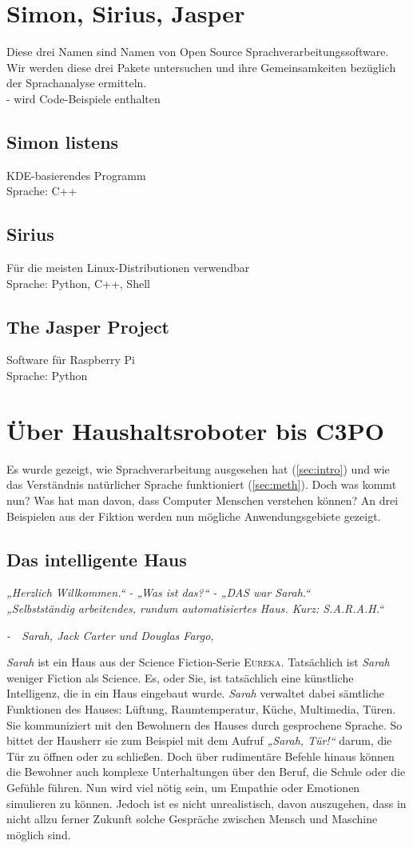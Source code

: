 \documentclass[12pt,twoside]{article}
\theoremstyle{plain}
\theoremstyle{definition}
\theoremstyle{remark}
\begin{document}
\section{Simon, Sirius, Jasper}
\label{sec:software}
Diese drei Namen sind Namen von Open Source Sprachverarbeitungssoftware.
Wir werden diese drei Pakete untersuchen und ihre Gemeinsamkeiten bezüglich der Sprachanalyse ermitteln. \\
- wird Code-Beispiele enthalten
	\subsection{Simon listens}
	\label{ssec:simon}
	KDE-basierendes Programm\\
	Sprache: C++
	\subsection{Sirius}
	\label{ssec:sirius}
	Für die meisten Linux-Distributionen verwendbar\\
	Sprache: Python, C++, Shell
	\subsection{The Jasper Project}
	\label{ssec:jasper}
	Software für Raspberry Pi\\
	Sprache: Python
\section{Über Haushaltsroboter bis C3PO}
\label{sec:ausb}
Es wurde gezeigt, wie Sprachverarbeitung ausgesehen hat (\ref{sec:intro}) und wie das Verständnis natürlicher Sprache funktioniert (\ref{sec:meth}).
Doch was kommt nun?
Was hat man davon, dass Computer Menschen verstehen können?
An drei Beispielen aus der Fiktion werden nun mögliche Anwendungsgebiete gezeigt.
\subsection{Das intelligente Haus}
\label{ssec:sarah}
\textit{„Herzlich Willkommen.“ - „Was ist das?“ - „DAS war Sarah.“\\
        „Selbstständig arbeitendes, rundum automatisiertes Haus. Kurz: S.A.R.A.H.“}
\begin{flushright}
    \textit{-~~Sarah, Jack Carter und Douglas Fargo, \cite{EUR103}}
\end{flushright}
\textit{Sarah} ist ein Haus aus der Science Fiction-Serie \textsc{Eureka}.
Tatsächlich ist \textit{Sarah} weniger Fiction als Science.
Es, oder Sie, ist tatsächlich eine künstliche Intelligenz, die in ein Haus eingebaut wurde.
\textit{Sarah} verwaltet dabei sämtliche Funktionen des Hauses: Lüftung, Raumtemperatur, Küche, Multimedia, Türen.
Sie kommuniziert mit den Bewohnern des Hauses durch gesprochene Sprache.
So bittet der Hausherr sie zum Beispiel mit dem Aufruf \textit{„Sarah, Tür!“} darum, die Tür zu öffnen oder zu schließen.
Doch über rudimentäre Befehle hinaus können die Bewohner auch komplexe Unterhaltungen über den Beruf, die Schule oder die Gefühle führen.
Nun wird viel nötig sein, um Empathie oder Emotionen simulieren zu können.
Jedoch ist es nicht unrealistisch, davon auszugehen, dass in nicht allzu ferner Zukunft solche Gespräche zwischen Mensch und Maschine möglich sind.
\end{document}
